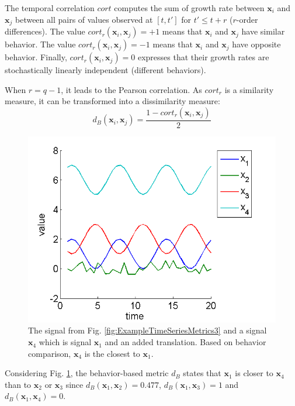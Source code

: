 The temporal correlation $cort$ computes the sum of growth rate between $\textbf{x}_i$ and $\textbf{x}_j$ between all pairs of values observed at $[t ,t']$ for $t' \leq t+r$ ($r$-order differences). The value $cort_r(\textbf{x}_i,\textbf{x}_j) = +1$ means that $\textbf{x}_i$ and $\textbf{x}_j$  have similar behavior. The value $cort_r(\textbf{x}_i,\textbf{x}_j) = -1$ means that $\textbf{x}_i$ and $\textbf{x}_j$ have opposite behavior. Finally, $cort_r(\textbf{x}_i,\textbf{x}_j) = 0$ expresses that their growth rates are stochastically linearly independent (different behaviors). 

When $r=q-1$, it leads to the Pearson correlation. As $cort_r$ is a similarity measure, it can be transformed into a dissimilarity measure:
\begin{equation}
	d_B(\textbf{x}_i,\textbf{x}_j) = \frac{1 - cort_r(\textbf{x}_i,\textbf{x}_j)}{2}
	\label{eq:B}
\end{equation}

\begin{figure}[h!]
	\centering
	\includegraphics[width=0.6\linewidth]{images/ExampleTimeSeriesMetrics4}
	\caption[4 toys time series in the temporal domain.]{The signal from Fig. \ref{fig:ExampleTimeSeriesMetrics3} and a signal $\textbf{x}_4$ which is signal $\textbf{x}_1$ and an added translation. Based on behavior comparison, $\textbf{x}_4$ is the closest to $\textbf{x}_1$.}
	\label{fig:ExampleTimeSeriesMetrics4}
\end{figure}

\noindent Considering Fig. \ref{fig:ExampleTimeSeriesMetrics4}, the behavior-based metric $d_B$ states that $\textbf{x}_1$ is closer to $\textbf{x}_4$ than to $\textbf{x}_2$ or $\textbf{x}_3$ since $d_B(\textbf{x}_1,\textbf{x}_2) = 0.477$,  
$d_B(\textbf{x}_1,\textbf{x}_3) = 1$ and  
$d_B(\textbf{x}_1,\textbf{x}_4) = 0$. 



